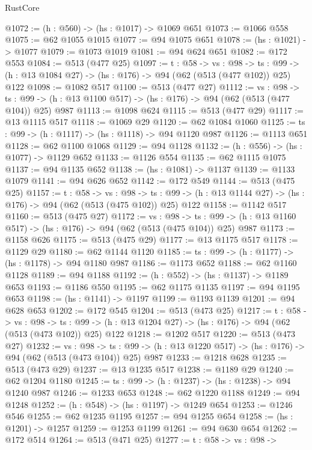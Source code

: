 \begin{lexlean}{RustCore}
\begin{coremodule}
@1072 := (h : @560) -> (hs : @1017) -> @1069 @651
@1073 := @1066 @558
@1075 := @62 @1055 @1015
@1077 := @94 @1075 @651
@1078 := (hs : @1021) -> @1077
@1079 := @1073 @1019
@1081 := @94 @624 @651
@1082 := @172 @553
@1084 := @513 (@477 @25)
@1097 := {t : @58} ->
  {vs : @98} ->
  {ts : @99} -> (h : @13 @1084 @27) -> (hs : @176) -> @94 (@62 (@513 (@477 @102)) @25) @122
@1098 := @1082 @517
@1100 := @513 (@477 @27)
@1112 := {vs : @98} ->
  {ts : @99} -> (h : @13 @1100 @517) -> (hs : @176) -> @94 (@62 (@513 (@477 @104)) @25) @987
@1113 := @1098 @624
@1115 := @513 (@477 @29)
@1117 := @13 @1115 @517
@1118 := @1069 @29
@1120 := @62 @1084 @1060
@1125 := {ts : @99} -> (h : @1117) -> (hs : @1118) -> @94 @1120 @987
@1126 := @1113 @651
@1128 := @62 @1100 @1068
@1129 := @94 @1128
@1132 := (h : @556) -> (hs : @1077) -> @1129 @652
@1133 := @1126 @554
@1135 := @62 @1115 @1075
@1137 := @94 @1135 @652
@1138 := (hs : @1081) -> @1137
@1139 := @1133 @1079
@1141 := @94 @626 @652
@1142 := @172 @549
@1144 := @513 (@475 @25)
@1157 := {t : @58} ->
  {vs : @98} ->
  {ts : @99} -> (h : @13 @1144 @27) -> (hs : @176) -> @94 (@62 (@513 (@475 @102)) @25) @122
@1158 := @1142 @517
@1160 := @513 (@475 @27)
@1172 := {vs : @98} ->
  {ts : @99} -> (h : @13 @1160 @517) -> (hs : @176) -> @94 (@62 (@513 (@475 @104)) @25) @987
@1173 := @1158 @626
@1175 := @513 (@475 @29)
@1177 := @13 @1175 @517
@1178 := @1129 @29
@1180 := @62 @1144 @1120
@1185 := {ts : @99} -> (h : @1177) -> (hs : @1178) -> @94 @1180 @987
@1186 := @1173 @652
@1188 := @62 @1160 @1128
@1189 := @94 @1188
@1192 := (h : @552) -> (hs : @1137) -> @1189 @653
@1193 := @1186 @550
@1195 := @62 @1175 @1135
@1197 := @94 @1195 @653
@1198 := (hs : @1141) -> @1197
@1199 := @1193 @1139
@1201 := @94 @628 @653
@1202 := @172 @545
@1204 := @513 (@473 @25)
@1217 := {t : @58} ->
  {vs : @98} ->
  {ts : @99} -> (h : @13 @1204 @27) -> (hs : @176) -> @94 (@62 (@513 (@473 @102)) @25) @122
@1218 := @1202 @517
@1220 := @513 (@473 @27)
@1232 := {vs : @98} ->
  {ts : @99} -> (h : @13 @1220 @517) -> (hs : @176) -> @94 (@62 (@513 (@473 @104)) @25) @987
@1233 := @1218 @628
@1235 := @513 (@473 @29)
@1237 := @13 @1235 @517
@1238 := @1189 @29
@1240 := @62 @1204 @1180
@1245 := {ts : @99} -> (h : @1237) -> (hs : @1238) -> @94 @1240 @987
@1246 := @1233 @653
@1248 := @62 @1220 @1188
@1249 := @94 @1248
@1252 := (h : @548) -> (hs : @1197) -> @1249 @654
@1253 := @1246 @546
@1255 := @62 @1235 @1195
@1257 := @94 @1255 @654
@1258 := (hs : @1201) -> @1257
@1259 := @1253 @1199
@1261 := @94 @630 @654
@1262 := @172 @514
@1264 := @513 (@471 @25)
@1277 := {t : @58} ->
  {vs : @98} ->

\end{coremodule}
\end{lexlean}
